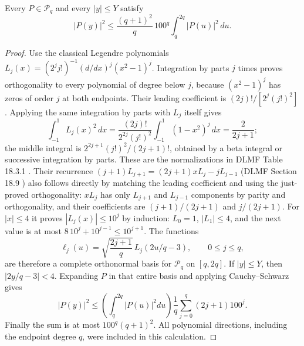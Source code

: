 \begin{lemma}
Every $P\in\mathcal P_q$ and every $|y|\leq Y$ satisfy
\[
 |P(y)|^2\leq\frac{(q+1)^2}{q}\,100^q
                    \int_q^{2q}|P(u)|^2\,du.     \tag{RC8}
\]
\end{lemma}
\begin{proof}
Use the classical Legendre polynomials
$L_j(x)=(2^j j!)^{-1}(d/dx)^j(x^2-1)^j$.
Integration by parts $j$ times proves orthogonality to every polynomial
of degree below $j$, because $(x^2-1)^j$ has zeros of order $j$ at both
endpoints.
Their leading coefficient is $(2j)!/[2^j(j!)^2]$.
Applying the same integration by parts with $L_j$ itself gives
\[
 \int_{-1}^1L_j(x)^2\,dx
 =\frac{(2j)!}{2^{2j}(j!)^2}
                 \int_{-1}^1(1-x^2)^j\,dx
 =\frac2{2j+1};
\]
the middle integral is
$2^{2j+1}(j!)^2/(2j+1)!$, obtained by a beta integral or
successive integration by parts.
These are the normalizations in DLMF Table 18.3.1
\cite{rc:DLMF183}.
Their recurrence
$(j+1)L_{j+1}=(2j+1)xL_j-jL_{j-1}$
(DLMF Section 18.9 \cite{rc:DLMF189}) also follows directly by matching
the leading coefficient and using the just-proved orthogonality:
$xL_j$ has only $L_{j+1}$ and $L_{j-1}$ components by parity and
orthogonality, and their coefficients are
$(j+1)/(2j+1)$ and $j/(2j+1)$.
For $|x|\leq4$ it proves $|L_j(x)|\leq10^j$ by induction:
$L_0=1$, $|L_1|\leq4$, and the next value is at most
$8\,10^j+10^{j-1}\leq10^{j+1}$.
The functions
\[
 \ell_j(u)=\sqrt{\frac{2j+1}{q}}\,L_j(2u/q-3),
 \qquad 0\leq j\leq q,
\]
are therefore a complete orthonormal basis for $\mathcal P_q$ on
$[q,2q]$. If $|y|\leq Y$, then $|2y/q-3|<4$.
Expanding $P$ in that entire basis and applying Cauchy--Schwarz gives
\[
 |P(y)|^2\leq
 \left(\int_q^{2q}|P(u)|^2du\right)
 \frac1q\sum_{j=0}^q(2j+1)100^j.
\]
Finally the sum is at most $100^q(q+1)^2$.
All polynomial directions, including the endpoint degree $q$, were
included in this calculation.
\end{proof}

